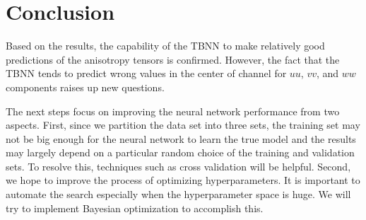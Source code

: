 \documentclass{article}
\numberwithin{equation}{section}
\begin{document}
\section{Conclusion}

Based on the results, the capability of the TBNN to make relatively good predictions of the anisotropy tensors is confirmed. However, the fact that the TBNN tends to predict wrong values in the center of channel for $uu$, $vv$, and $ww$ components raises up new questions. 

The next steps focus on improving the neural network performance from two aspects. First, since we partition the data set into three sets, the training set may not be big enough for the neural network to learn the true model and the results may largely depend on a particular random choice of the training and validation sets. To resolve this, techniques such as cross validation will be helpful. Second, we hope to improve the process of optimizing hyperparameters. It is important to automate the search especially when the hyperparameter space is huge. We will try to implement Bayesian optimization to accomplish this. 






    
\end{document}
